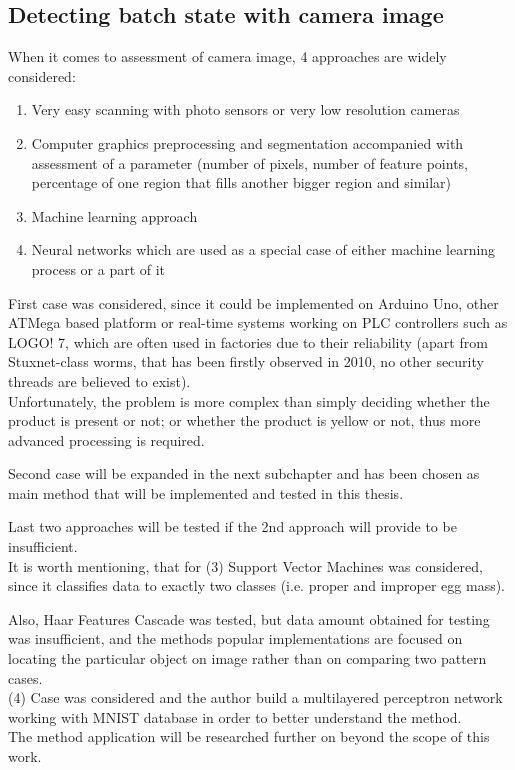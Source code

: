 \documentclass[12pt,twoside,a4paper]{article}
\begin{document}
\subsection{Detecting batch state with camera image}

When it comes to assessment of camera image, 4 approaches are widely considered:
\begin{enumerate}
\item Very easy scanning with photo sensors or very low resolution cameras
\item Computer graphics preprocessing and segmentation accompanied with assessment of a parameter (number of pixels, number of feature points, percentage of one region that fills another bigger region and similar)
\item Machine learning approach
\item Neural networks which are used as a special case of either machine learning process or a part of it 
\end{enumerate}
First case was considered, since it could be implemented on Arduino Uno, other ATMega based platform or real-time systems working on PLC controllers such as LOGO! 7, which are often used in factories due to their reliability (apart from Stuxnet-class worms, that has been firstly observed in 2010, no other security threads are believed to exist).\\
Unfortunately, the problem is more complex than simply deciding whether the product is present or not; or whether the product is yellow or not, thus more advanced processing is required.

Second case will be expanded in the next subchapter and has been chosen as main method that will be implemented and tested in this thesis.

Last two approaches will be tested if the 2nd approach will provide to be insufficient.\\
It is worth mentioning, that for (3) Support Vector Machines was considered, since it classifies data to exactly two classes (i.e. proper and improper egg mass).

Also, Haar Features Cascade was tested, but data amount obtained for testing was insufficient, and the methods popular implementations are focused on locating the particular object on image rather than on comparing two pattern cases.\\
(4) Case was considered and the author build a multilayered perceptron network working with MNIST database in order to better understand the method.\\
The method application will be researched further on beyond the scope of this work.
\end{document}
